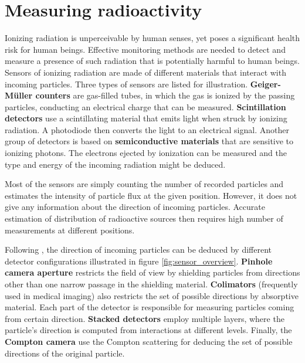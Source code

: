 \section{Measuring radioactivity}
Ionizing radiation is unperceivable by human senses, yet poses a significant health risk for human beings.
Effective monitoring methods are needed to detect and measure a presence of such radiation that is potentially harmful to human beings.
Sensors of ionizing radiation are made of different materials that interact with incoming particles.
Three types of sensors are listed for illustration.
\textbf{Geiger-Müller  counters} are gas-filled tubes, in which the gas is ionized by the passing particles, conducting an electrical charge that can be measured.
\textbf{Scintillation detectors} use a scintillating material that emits light when struck by ionizing radiation.
A photodiode then converts the light to an electrical signal.
Another group of detectors is based on \textbf{semiconductive materials} that are sensitive to ionizing photons. 
The electrons ejected by ionization can be measured and the type and energy of the incoming radiation might be deduced. 

Most of the sensors are simply counting the number of recorded particles and estimates the intensity of particle flux at the given position. 
However, it does not give any information about the direction of incoming particles.
Accurate estimation of distribution of radioactive sources then requires high number of measurements at different positions. 

Following \cite{baca2019timepix}, the direction of incoming particles can be deduced by different detector configurations illustrated in figure \ref{fig:sensor_overview}.
\textbf{Pinhole camera aperture} restricts the field of view by shielding particles from directions other than one narrow passage in the shielding material.
\textbf{Colimators} (frequently used in medical imaging) also restricts the set of possible directions by absorptive material. 
Each part of the detector is responsible for measuring particles coming from certain direction. 
\textbf{Stacked detectors} employ multiple layers, where the particle's direction is computed from interactions at different levels.
Finally, the \textbf{Compton camera} use the Compton scattering for deducing the set of possible directions of the original particle. 




